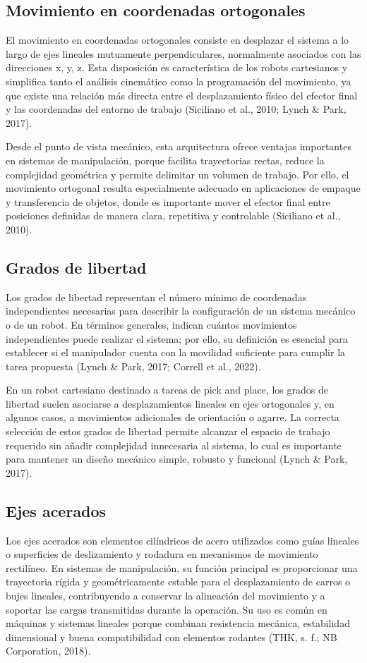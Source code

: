 \subsection{Movimiento en coordenadas ortogonales}
El movimiento en coordenadas ortogonales consiste en desplazar el sistema a lo largo de ejes lineales mutuamente perpendiculares, normalmente asociados con las direcciones x, y, z. Esta disposición es característica de los robots cartesianos y simplifica tanto el análisis cinemático como la programación del movimiento, ya que existe una relación más directa entre el desplazamiento físico del efector final y las coordenadas del entorno de trabajo (Siciliano et al., 2010; Lynch \& Park, 2017).

Desde el punto de vista mecánico, esta arquitectura ofrece ventajas importantes en sistemas de manipulación, porque facilita trayectorias rectas, reduce la complejidad geométrica y permite delimitar un volumen de trabajo. Por ello, el movimiento ortogonal resulta especialmente adecuado en aplicaciones de empaque y transferencia de objetos, donde es importante mover el efector final entre posiciones definidas de manera clara, repetitiva y controlable (Siciliano et al., 2010).

\subsection{Grados de libertad}
Los grados de libertad representan el número mínimo de coordenadas independientes necesarias para describir la configuración de un sistema mecánico o de un robot. En términos generales, indican cuántos movimientos independientes puede realizar el sistema; por ello, su definición es esencial para establecer si el manipulador cuenta con la movilidad suficiente para cumplir la tarea propuesta (Lynch \& Park, 2017; Correll et al., 2022).

En un robot cartesiano destinado a tareas de pick and place, los grados de libertad suelen asociarse a desplazamientos lineales en ejes ortogonales y, en algunos casos, a movimientos adicionales de orientación o agarre. La correcta selección de estos grados de libertad permite alcanzar el espacio de trabajo requerido sin añadir complejidad innecesaria al sistema, lo cual es importante para mantener un diseño mecánico simple, robusto y funcional (Lynch \& Park, 2017).

\subsection{Ejes acerados}
Los ejes acerados son elementos cilíndricos de acero utilizados como guías lineales o superficies de deslizamiento y rodadura en mecanismos de movimiento rectilíneo. En sistemas de manipulación, su función principal es proporcionar una trayectoria rígida y geométricamente estable para el desplazamiento de carros o bujes lineales, contribuyendo a conservar la alineación del movimiento y a soportar las cargas transmitidas durante la operación. Su uso es común en máquinas y sistemas lineales porque combinan resistencia mecánica, estabilidad dimensional y buena compatibilidad con elementos rodantes (THK, s. f.; NB Corporation, 2018).

